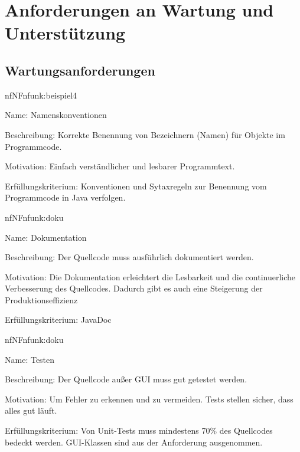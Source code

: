 \section{Anforderungen an Wartung und Unterstützung}

\subsection{Wartungsanforderungen}

\begin{description}[leftmargin=5em, style=sameline]	
	\begin{lhp}{nf}{NF}{nfunk:beispiel4}
		\item [Name:] Namenskonventionen
		\item [Beschreibung:] Korrekte Benennung von Bezeichnern (Namen) für Objekte im Programmcode.
		\item [Motivation:] Einfach verständlicher und lesbarer Programmtext.
		\item [Erfüllungskriterium:] Konventionen und Sytaxregeln zur Benennung vom Programmcode in Java verfolgen.
	\end{lhp}
\end{description}

\begin{description}[leftmargin=5em, style=sameline]	
	\begin{lhp}{nf}{NF}{nfunk:doku}
		\item [Name:] Dokumentation
		\item [Beschreibung:] Der Quellcode muss ausführlich dokumentiert werden.
		\item [Motivation:] Die Dokumentation erleichtert die Lesbarkeit und die continuerliche Verbesserung des Quellcodes. Dadurch gibt es auch eine Steigerung der Produktionseffizienz
		\item [Erfüllungskriterium:] JavaDoc 
	\end{lhp}
\end{description}

\begin{description}[leftmargin=5em, style=sameline]	
	\begin{lhp}{nf}{NF}{nfunk:doku}
		\item [Name:] Testen
		\item [Beschreibung:] Der Quellcode außer GUI muss gut getestet werden.
		\item [Motivation:] Um Fehler zu erkennen und zu vermeiden. Tests stellen sicher, dass alles gut läuft.
		\item [Erfüllungskriterium:] Von Unit-Tests muss mindestens 70\% des Quellcodes bedeckt werden. GUI-Klassen sind aus der Anforderung ausgenommen.
	\end{lhp}
\end{description}

